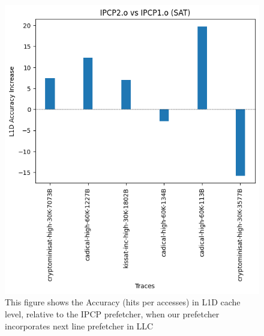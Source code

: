 \documentclass[conference]{IEEEtran}
\begin{document}
\begin{figure}
\includegraphics[scale=0.5]{Images/Bingo/sat_l1d.png}
\caption{This figure shows the Accuracy (hits per accesses) in L1D cache level, relative to the IPCP prefetcher, when our prefetcher incorporates next line prefetcher in LLC}
\label{sat_l1d}
\end{figure}
\end{document}
